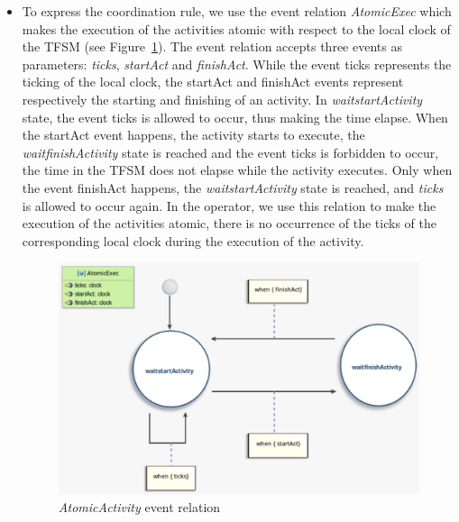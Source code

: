 \begin{itemize}
	 
	 \item To express the coordination rule, we use the event relation \emph{AtomicExec} which makes the execution of the activities atomic with respect to the local clock of the TFSM (see Figure~\ref{fig:atomicexec}). The event relation accepts three events as parameters: \emph{ticks}, \emph{startAct} and \emph{finishAct}. While the event ticks represents the ticking of the local clock, the startAct and finishAct events represent respectively the starting and finishing of an activity. In \emph{waitstartActivity} state, the event ticks is allowed to occur, thus making the time elapse. When the startAct event happens, \ie the activity starts to execute, the \emph{waitfinishActivity} state is reached and the event ticks is forbidden to occur, \ie the time in the TFSM does not elapse while the activity executes. Only when the event finishAct happens, the \emph{waitstartActivity} state is reached, and \emph{ticks} is allowed to occur again. In the operator, we use this relation to make the execution of the activities atomic, \ie there is no occurrence of the \dse ticks of the corresponding local clock during the execution of the activity.
	 
	 
	 \begin{figure}
	 	\center
	 	\includegraphics[width=.7\columnwidth]{examples/figs/AtomicExec}
	 	\caption{\emph{AtomicActivity} event relation}
	 	\label{fig:atomicexec}
	 \end{figure}
	 
	 
	 

\end{itemize}
